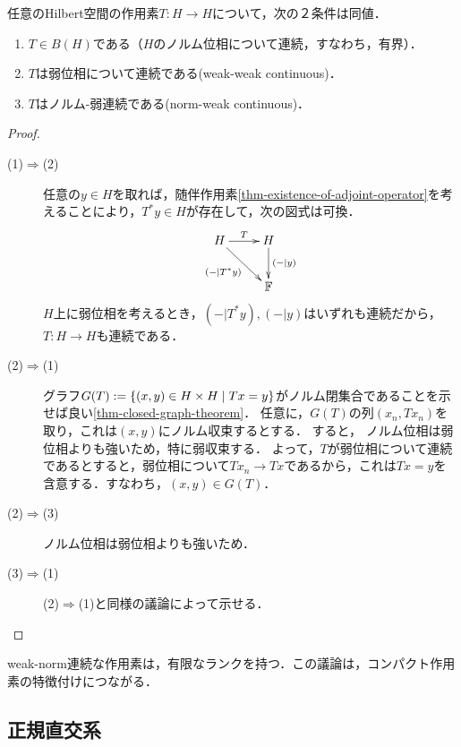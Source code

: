 \documentclass[uplatex,dvipdfmx]{jsreport}
\begin{document}
\begin{lemma}\label{lemma-characterization-of-bounded-operator-on-Hilbert-space}
    任意のHilbert空間の作用素$T:H\to H$について，次の２条件は同値．
    \begin{enumerate}
        \item $T\in B(H)$である（$H$のノルム位相について連続，すなわち，有界）．
        \item $T$は弱位相について連続である(weak-weak continuous)．
        \item $T$はノルム-弱連続である(norm-weak continuous)．
    \end{enumerate}
\end{lemma}
\begin{proof}\mbox{}
    \begin{description}
        \item[(1)$\Rightarrow$(2)] 任意の$y\in H$を取れば，随伴作用素\ref{thm-existence-of-adjoint-operator}を考えることにより，$T^*y\in H$が存在して，次の図式は可換．
        \[\xymatrix{
            H\ar[r]^-T\ar[dr]_-{(-|T^*y)}&H\ar[d]^-{(-|y)}\\
            &\bF
        }\]
        $H$上に弱位相を考えるとき，$(-|T^*y),(-|y)$はいずれも連続だから，$T:H\to H$も連続である．
        \item[(2)$\Rightarrow$(1)] 
        グラフ$G(T):=\left\{(x,y)\in H\times H\mid Tx=y\right\}$がノルム閉集合であることを示せば良い\ref{thm-closed-graph-theorem}．
        任意に，$G(T)$の列$(x_n,Tx_n)$を取り，これは$(x,y)$にノルム収束するとする．
        すると，
        ノルム位相は弱位相よりも強いため，特に弱収束する．
        よって，$T$が弱位相について連続であるとすると，弱位相について$Tx_n\to Tx$であるから，これは$Tx=y$を含意する．すなわち，$(x,y)\in G(T)$．
        \item[(2)$\Rightarrow$(3)] ノルム位相は弱位相よりも強いため．
        \item[(3)$\Rightarrow$(1)] (2)$\Rightarrow$(1)と同様の議論によって示せる．
    \end{description}
\end{proof}

\begin{remarks}
    weak-norm連続な作用素は，有限なランクを持つ．この議論は，コンパクト作用素の特徴付けにつながる．
\end{remarks}

\subsection{正規直交系}
\end{document}
